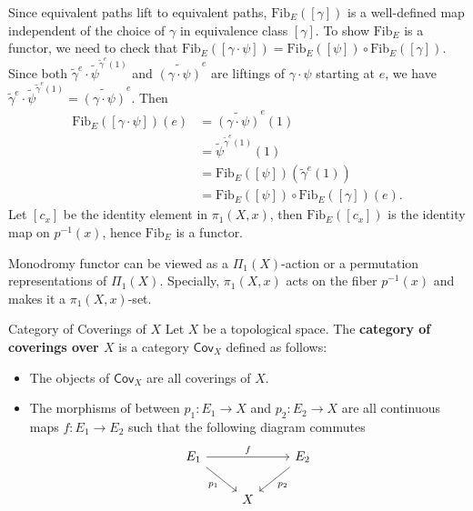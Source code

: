 \documentclass{report}
\begin{document}
\begin{prf}
	Since equivalent paths lift to equivalent paths, $\mathrm{Fib}_E([\gamma])$ is a well-defined map independent of the choice of $\gamma$ in equivalence class $[\gamma]$. To show $\mathrm{Fib}_E$ is a functor, we need to check that $\mathrm{Fib}_E([\gamma\cdot\psi])=\mathrm{Fib}_E([\psi])\circ\mathrm{Fib}_E([\gamma])$. Since both $\widetilde{\gamma}^e\cdot\widetilde{\psi}^{\widetilde{\gamma}^e(1)}$ and $\widetilde{(\gamma\cdot\psi)}^e$ are liftings of $\gamma\cdot\psi$ starting at $e$, we have $\widetilde{\gamma}^e\cdot\widetilde{\psi}^{\widetilde{\gamma}^e(1)}=\widetilde{(\gamma\cdot\psi)}^e$. Then
	\begin{align*}
		\mathrm{Fib}_E([\gamma\cdot\psi])(e)&=\widetilde{(\gamma\cdot\psi)}^e(1)\\
		&=\widetilde{\psi}^{\widetilde{\gamma}^e(1)}(1)\\
		&=\mathrm{Fib}_E([\psi])(\widetilde{\gamma}^e(1))\\
		&=\mathrm{Fib}_E([\psi])\circ\mathrm{Fib}_E([\gamma])(e).
	\end{align*}
	Let $[c_x]$ be the identity element in $\pi_1(X,x)$, then $\mathrm{Fib}_E([c_x])$ is the identity map on $p^{-1}(x)$, hence $\mathrm{Fib}_E$ is a functor.
\end{prf}
Monodromy functor can be viewed as a $\Pi_1(X)$-action or a permutation representations of $\Pi_1(X)$. Specially, $\pi_1(X, x)$ acts on the fiber $p^{-1}(x)$ and makes it a $\pi_1(X, x)$-set. 


\begin{definition}{Category of Coverings of $X$}{}
	Let $X$ be a topological space. The \textbf{category of coverings over $X$} is a category $\mathsf{Cov}_X$ defined as follows:
	\begin{itemize}
		\item The objects of $\mathsf{Cov}_X$ are all coverings of $X$.
		\item The morphisms of between $p_1:E_1\to X$ and $p_2:E_2\to X$ are all continuous maps $f:E_1\to E_2$ such that the following diagram commutes
		\begin{equation*}
			\begin{tikzcd}[ampersand replacement=\&]
				E_1 \arrow[rr, "f"] \arrow[rd, "p_1"'] \& \& E_2 \arrow[ld, "p_2"] \\ 
				\& X \&
			\end{tikzcd}
		\end{equation*}
	\end{itemize}
\end{definition}
\end{document}
